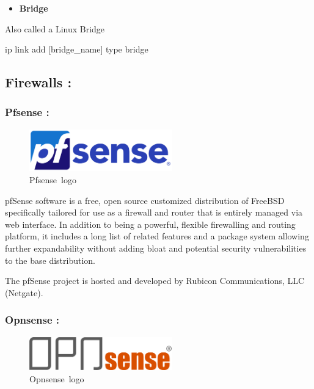 \documentclass[
  14pt,
  english,
  a4paper,
]{scrreprt}
\newenvironment{Shaded}{}{}
\newcommand{\ExtensionTok}[1]{#1}
\newcommand{\NormalTok}[1]{#1}
\providecommand{\tightlist}{%
  \setlength{\itemsep}{0pt}\setlength{\parskip}{0pt}}
\begin{document}
\begin{itemize}
\tightlist
\item
  \textbf{Bridge}
\end{itemize}

Also called a Linux Bridge

\begin{Shaded}
\begin{Highlighting}[]
\ExtensionTok{ip}\NormalTok{ link add [bridge\_name] type bridge}
\end{Highlighting}
\end{Shaded}

\hypertarget{firewalls}{%
\subsection{Firewalls :}\label{firewalls}}

\hypertarget{pfsense}{%
\subsubsection{Pfsense :}\label{pfsense}}

\begin{figure}
\centering
\includegraphics[width=0.55\textwidth,height=\textheight]{figures/Pfsense-blue-text-logo.png}
\caption{Pfsense~logo}
\end{figure}

pfSense software is a free, open source customized distribution of
FreeBSD specifically tailored for use as a firewall and router that is
entirely managed via web interface. In addition to being a powerful,
flexible firewalling and routing platform, it includes a long list of
related features and a package system allowing further expandability
without adding bloat and potential security vulnerabilities to the base
distribution.

The pfSense project is hosted and developed by Rubicon Communications,
LLC (Netgate).

\hypertarget{opnsense}{%
\subsubsection{Opnsense :}\label{opnsense}}

\begin{figure}
\centering
\includegraphics[width=0.55\textwidth,height=\textheight]{figures/Opnsense-logo.png}
\caption{Opnsense~logo}
\end{figure}
\end{document}
